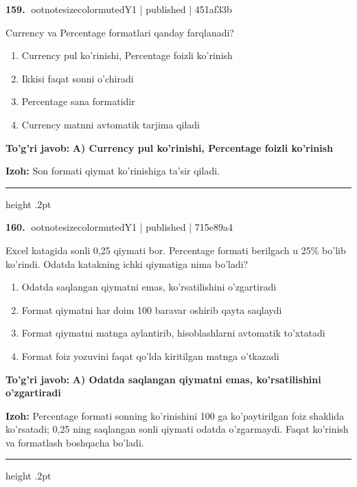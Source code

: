 \documentclass[10pt,a4paper]{article}
\begin{document}
\textbf{\color{ink}159.} {ootnotesizecolor{muted}Y1 | published | 451af33b}
\par
Currency va Percentage formatlari qanday farqlanadi?
\begin{enumerate}[label=\Alph*),leftmargin=9mm]
\item Currency pul ko'rinishi, Percentage foizli ko'rinish
\item Ikkisi faqat sonni o'chiradi
\item Percentage sana formatidir
\item Currency matnni avtomatik tarjima qiladi
\end{enumerate}
\begin{tcolorbox}[enhanced,breakable,colback=teal!4,colframe=teal!55!black,boxrule=0.45pt,arc=1.2mm,left=2.8mm,right=2.8mm,top=2mm,bottom=2mm]
\textbf{\color{teal}To'g'ri javob:} \textbf{A) Currency pul ko'rinishi, Percentage foizli ko'rinish}
\par\smallskip
\textbf{Izoh:} Son formati qiymat ko'rinishiga ta'sir qiladi.
\end{tcolorbox}
\vspace{2mm}\hrule height .2pt\vspace{2mm}

\textbf{\color{ink}160.} {ootnotesizecolor{muted}Y1 | published | 715e89a4}
\par
Excel katagida sonli 0,25 qiymati bor. Percentage formati berilgach u 25\% bo'lib ko'rindi. Odatda katakning ichki qiymatiga nima bo'ladi?
\begin{enumerate}[label=\Alph*),leftmargin=9mm]
\item Odatda saqlangan qiymatni emas, ko'rsatilishini o'zgartiradi
\item Format qiymatni har doim 100 baravar oshirib qayta saqlaydi
\item Format qiymatni matnga aylantirib, hisoblashlarni avtomatik to'xtatadi
\item Format foiz yozuvini faqat qo'lda kiritilgan matnga o'tkazadi
\end{enumerate}
\begin{tcolorbox}[enhanced,breakable,colback=teal!4,colframe=teal!55!black,boxrule=0.45pt,arc=1.2mm,left=2.8mm,right=2.8mm,top=2mm,bottom=2mm]
\textbf{\color{teal}To'g'ri javob:} \textbf{A) Odatda saqlangan qiymatni emas, ko'rsatilishini o'zgartiradi}
\par\smallskip
\textbf{Izoh:} Percentage formati sonning ko'rinishini 100 ga ko'paytirilgan foiz shaklida ko'rsatadi; 0,25 ning saqlangan sonli qiymati odatda o'zgarmaydi. Faqat ko'rinish va formatlash boshqacha bo'ladi.
\end{tcolorbox}
\vspace{2mm}\hrule height .2pt\vspace{2mm}
\end{document}
